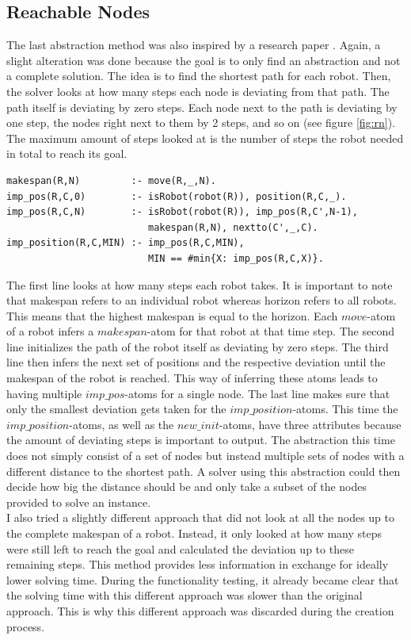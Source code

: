 \documentclass[runningheads]{llncs}
\begin{document}
\subsection{Reachable Nodes}
The last abstraction method was also inspired by a research paper \cite{rn}. Again, a slight alteration was done because the goal is to only find an abstraction and not a complete solution. The idea is to find the shortest path for each robot. Then, the solver looks at how many steps each node is deviating from that path. The path itself is deviating by zero steps. Each node next to the path is deviating by one step, the nodes right next to them by 2  steps, and so on (see figure \ref{fig:rn}). The maximum amount of steps looked at is the number of steps the robot needed in total to reach its goal. 
\begin{verbatim}
makespan(R,N)         :- move(R,_,N).
imp_pos(R,C,0)        :- isRobot(robot(R)), position(R,C,_).
imp_pos(R,C,N)        :- isRobot(robot(R)), imp_pos(R,C',N-1), 
                         makespan(R,N), nextto(C',_,C).
imp_position(R,C,MIN) :- imp_pos(R,C,MIN), 
                         MIN == #min{X: imp_pos(R,C,X)}.
\end{verbatim}
The first line looks at how many steps each robot takes. It is important to note that makespan refers to an individual robot whereas horizon refers to all robots. This means that the highest makespan is equal to the horizon. Each $move$-atom of a robot infers a $makespan$-atom for that robot at that time step. The second line initializes the path of the robot itself as deviating by zero steps. The third line then infers the next set of positions and the respective deviation until the makespan of the robot is reached. This way of inferring these atoms leads to having multiple $imp\_pos$-atoms for a single node. The last line makes sure that only the smallest deviation gets taken for the $imp\_position$-atoms. This time the $imp\_position$-atoms, as well as the $new\_init$-atoms, have three attributes because the amount of deviating steps is important to output. The abstraction this time does not simply consist of a set of nodes but instead multiple sets of nodes with a different distance to the shortest path. A solver using this abstraction could then decide how big the distance should be and only take a subset of the nodes provided to solve an instance. \\
I also tried a slightly different approach that did not look at all the nodes up to the complete makespan of a robot. Instead, it only looked at how many steps were still left to reach the goal and calculated the deviation up to these remaining steps. This method provides less information in exchange for ideally lower solving time. During the functionality testing, it already became clear that the solving time with this different approach was slower than the original approach. This is why this different approach was discarded during the creation process.
\end{document}
